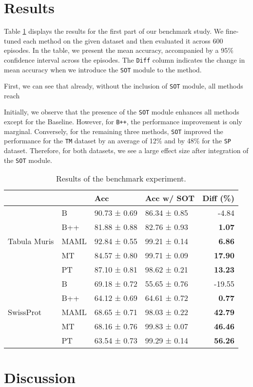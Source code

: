 \documentclass{article}
\begin{document}
\section{Results}
Table \ref{tab:tuned-benchmark} displays the results for the first part of our benchmark study. We fine-tuned each method on the given dataset and then evaluated it across 600 episodes. In the table, we present the mean accuracy, accompanied by a 95\% confidence interval across the episodes. The \texttt{Diff} column indicates the change in mean accuracy when we introduce the \texttt{SOT} module to the method.

First, we can see that already, without the inclusion of \texttt{SOT} module, all methods reach 


Initially, we observe that the presence of the \texttt{SOT} module enhances all methods except for the Baseline. However, for \texttt{B++}, the performance improvement is only marginal. Conversely, for the remaining three methods, \texttt{SOT} improved the performance for the \texttt{TM} dataset by an average of 12\% and by 48\% for the \texttt{SP} dataset. Therefore, for both datasets, we see a large effect size after integration of the \texttt{SOT} module.

\begin{table}[!ht]
\caption{Results of the benchmark experiment.}
\label{tab:tuned-benchmark}
\centering
\begin{tabular}{llllr}
\toprule
 &  & Acc & Acc w/ SOT & Diff (\%) \\
\midrule
\multirow[c]{5}{*}{Tabula Muris} & B & 90.73 ± 0.69 & 86.34 ± 0.85 & -4.84 \\
 & B++ & 81.88 ± 0.88 & 82.76 ± 0.93 & \bfseries 1.07 \\
 & MAML & 92.84 ± 0.55 & 99.21 ± 0.14 & \bfseries 6.86 \\
 & MT & 84.57 ± 0.80 & 99.71 ± 0.09 & \bfseries 17.90 \\
 & PT & 87.10 ± 0.81 & 98.62 ± 0.21 & \bfseries 13.23 \\
\midrule
\multirow[c]{5}{*}{SwissProt} & B & 69.18 ± 0.72 & 55.65 ± 0.76 & -19.55 \\
 & B++ & 64.12 ± 0.69 & 64.61 ± 0.72 & \bfseries 0.77 \\
 & MAML & 68.65 ± 0.71 & 98.03 ± 0.22 & \bfseries 42.79 \\
 & MT & 68.16 ± 0.76 & 99.83 ± 0.07 & \bfseries 46.46 \\
 & PT & 63.54 ± 0.73 & 99.29 ± 0.14 & \bfseries 56.26 \\
\bottomrule
\end{tabular}
\end{table}

\section{Discussion}

\newpage


\end{document}

